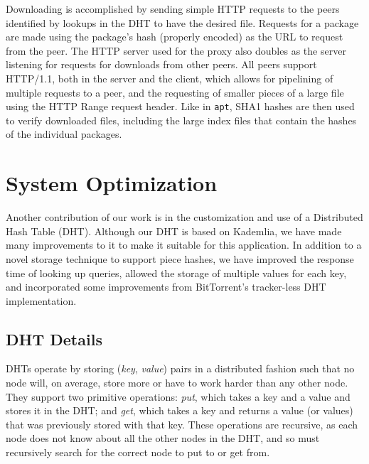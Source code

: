 \documentclass[conference]{IEEEtran}
\begin{document}
Downloading is accomplished by sending simple HTTP requests to the
peers identified by lookups in the DHT to have the desired file.
Requests for a package are made using the package's hash (properly
encoded) as the URL to request from the peer. The HTTP server used
for the proxy also doubles as the server listening for requests for
downloads from other peers. All peers support HTTP/1.1, both in the
server and the client, which allows for pipelining of multiple
requests to a peer, and the requesting of smaller pieces of a large
file using the HTTP Range request header. Like in \texttt{apt},
SHA1 hashes are then used to verify downloaded files, including the large
index files that contain the hashes of the individual packages.


\section{System Optimization}
\label{custom_dht}

Another contribution of our work is in the customization and use of
a Distributed Hash Table (DHT). Although our DHT is based on
Kademlia, we have made many improvements to it to make it suitable
for this application. In addition to a novel storage technique to
support piece hashes, we have improved the response time of looking
up queries, allowed the storage of multiple values for each key, and
incorporated some improvements from BitTorrent's tracker-less DHT
implementation.

\subsection{DHT Details}
\label{dht}

DHTs operate by storing (\emph{key}, \emph{value}) pairs in a
distributed fashion such that no node will, on average, store more or have to work harder
than any other node. They support two primitive operations:
\emph{put}, which takes a key and a value and stores it in the DHT;
and \emph{get}, which takes a key and returns a value (or values)
that was previously stored with that key. These operations are
recursive, as each node does not know about all the other nodes in the
DHT, and so must recursively search for the correct node to put to
or get from.
\end{document}
